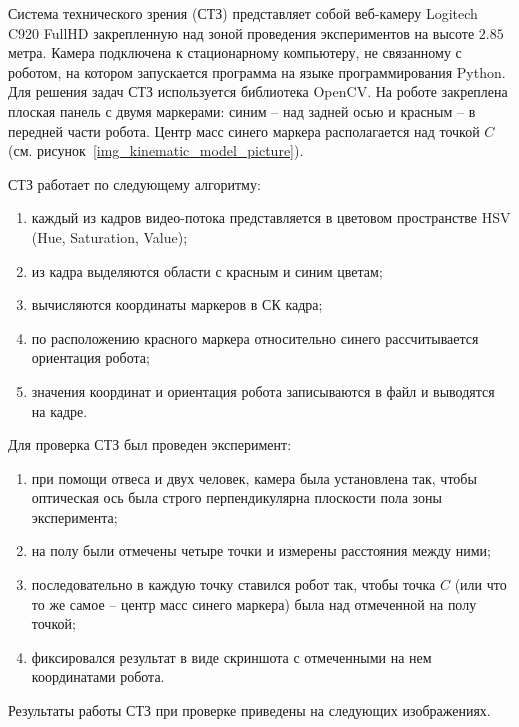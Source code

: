 \label{app_cv_system}

Система технического зрения (СТЗ) представляет собой веб-камеру Logitech C920 FullHD закрепленную над зоной проведения экспериментов на высоте $2.85$ метра. Камера подключена к стационарному компьютеру, не связанному с роботом, на котором запускается программа на языке программирования Python. Для решения задач СТЗ используется библиотека OpenCV. На роботе закреплена плоская панель с двумя маркерами: синим -- над задней осью и красным -- в передней части робота. Центр масс синего маркера располагается над точкой $C$ (см. рисунок~\ref{img_kinematic_model_picture}).

СТЗ работает по следующему алгоритму:
\begin{enumerate}
	\item каждый из кадров видео-потока представляется в цветовом пространстве HSV (Hue, Saturation, Value);
	\item из кадра выделяются области с красным и синим цветам;
	\item вычисляются координаты маркеров в СК кадра;
	\item по расположению красного маркера относительно синего рассчитывается ориентация робота;
	\item значения координат и ориентация робота записываются в файл и выводятся на кадре.  
\end{enumerate}

Для проверка СТЗ был проведен эксперимент:
\begin{enumerate}
	\item при помощи отвеса и двух человек, камера была установлена так, чтобы оптическая ось была строго перпендикулярна плоскости пола зоны эксперимента;
	\item на полу были отмечены четыре точки и измерены расстояния между ними;
	\item последовательно в каждую точку ставился робот так, чтобы точка $C$ (или что то же самое -- центр масс синего маркера) была над отмеченной на полу точкой;
	\item фиксировался результат в виде скриншота с отмеченными на нем координатами робота. 
\end{enumerate}

Результаты работы СТЗ при проверке приведены на следующих изображениях.

